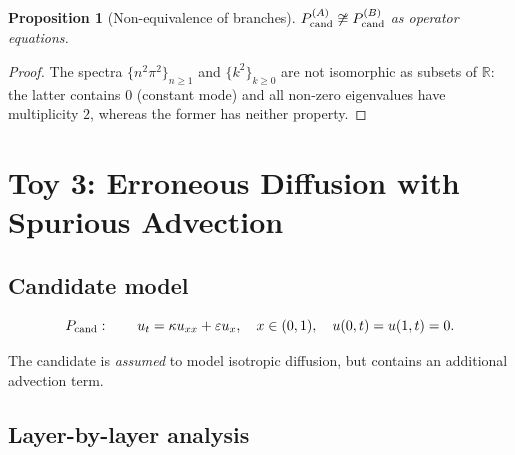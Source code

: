 \documentclass[11pt,a4paper]{article}
\theoremstyle{definition}
\theoremstyle{plain}
\newtheorem{proposition}[definition]{Proposition}
\newcommand{\R}{\mathbb{R}}
\begin{document}
\begin{proposition}[Non-equivalence of branches]\label{prop:non-equiv}
$P_{\rm cand}^{(A)} \not\cong P_{\rm cand}^{(B)}$ as operator
equations.
\end{proposition}

\begin{proof}
The spectra $\{n^2 \pi^2\}_{n \geq 1}$ and $\{k^2\}_{k \geq 0}$ are
not isomorphic as subsets of $\R$: the latter contains $0$ (constant
mode) and all non-zero eigenvalues have multiplicity $2$, whereas
the former has neither property.
\end{proof}

\section{Toy 3: Erroneous Diffusion with Spurious Advection}
\label{sec:toy3}

\subsection{Candidate model}

\[
  P_{\rm cand}: \qquad u_t = \kappa u_{xx} + \varepsilon u_x,
  \quad x \in (0,1), \quad u(0,t) = u(1,t) = 0.
\]

The candidate is \emph{assumed} to model isotropic diffusion, but
contains an additional advection term.

\subsection{Layer-by-layer analysis}
\end{document}
